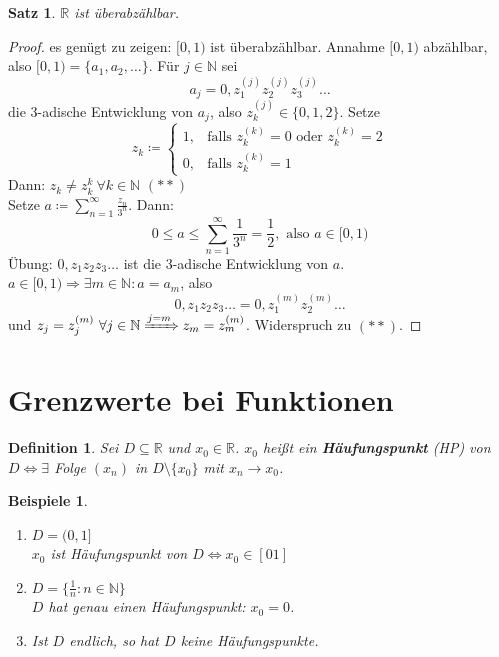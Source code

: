 \documentclass[14pt,titlepage,ngerman,a4paper,headsepline,DIV15,halfparskip*]{scrartcl}
\newcommand{\N}{\mathbb{N}}
\newcommand{\R}{\mathbb{R}}
\theoremstyle{named}
\theoremstyle{dotless}
\newtheorem{satz}[namedtheorem]{Satz}
\newtheorem*{beispiele}{Beispiele}
\newtheorem*{definition}{Definition}
\begin{document}
\begin{satz} \label{5.3:satz}
	$\R$ ist überabzählbar.
\end{satz}

\begin{proof}
	es genügt zu zeigen: $[0, 1)$ ist überabzählbar. Annahme $[0, 1)$ abzählbar, also $[0, 1) = \{ a_{1}, a_{2}, \dotsc \}$. Für $j \in \N$ sei
		$$ a_{j} = 0, z_{1}^{(j)} z_{2}^{(j)} z_{3}^{(j)} \dotsc $$
	die 3-adische Entwicklung von $a_{j}$, also $z_{k}^{(j)} \in \{ 0, 1, 2 \}$. Setze
		$$ z_{k} \coloneqq \begin{cases} 1, & \text{falls } z_{k}^{(k)} = 0 \text{ oder } z_{k}^{(k)} = 2 \\ 0, & \text{falls } z_{k}^{(k)} = 1 \end{cases} $$
	Dann: $z_{k} \neq z_{k}^{k} ~\forall k \in \N$ $(**)$ \\
	Setze $a \coloneqq \sum_{n=1}^{\infty} \frac{z_{n}}{3^{n}}$. Dann:
		$$ 0 \leq a \leq \sum_{n=1}^{\infty} \frac{1}{3^{n}} = \frac{1}{2}, \text{ also } a \in [0, 1) $$
	Übung: $0, z_{1} z_{2} z_{3} \dotsc$ ist die 3-adische Entwicklung von $a$.$a \in [0, 1) \Rightarrow \exists m \in \N: a = a_{m}$, also
		$$ 0, z_{1} z_{2} z_{3} \dotsc = 0, z_{1}^{(m)} z_{2}^{(m)} \dotsc $$
	und $z_{j} = z_{j}^{(m)} ~\forall j \in \N \xRightarrow[]{j = m} z_{m} = z_{m}^{(m)}$. Widerspruch zu $(**)$.
\end{proof}


\newpage


\section{Grenzwerte bei Funktionen}

\begin{definition}
	Sei $D \subseteq \R$ und $x_{0} \in \R$. $x_{0}$ hei{\ss}t ein \textbf{Häufungspunkt} (HP) von $D \iff \exists$ Folge $(x_{n})$ in $D \setminus \{ x_{0} \}$ mit $x_{n} \rightarrow x_{0}$.
\end{definition}


\begin{beispiele}
	\begin{enumerate}
		\item $D = (0, 1]$ \\ %
			$x_{0}$ ist Häufungspunkt von $D \iff x_{0} \in [0 1]$
		\item $D = \{ \frac{1}{n} : n \in \N \}$ \\ %
			$D$ hat genau einen Häufungspunkt: $x_{0} = 0$.
		\item Ist $D$ endlich, so hat $D$ keine Häufungspunkte. 
	\end{enumerate}	
\end{beispiele}
\end{document}
